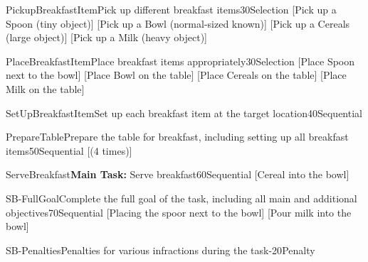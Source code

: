 
\begin{Group}{PickupBreakfastItem}{Pick up different breakfast items}{30}{Selection}
    [Pick up a Spoon (tiny object)]
    [Pick up a Bowl (normal-sized known)]
    [Pick up a Cereals (large object)]
    [Pick up a Milk (heavy object)]
\end{Group}

\begin{Group}{PlaceBreakfastItem}{Place breakfast items appropriately}{30}{Selection}
    [Place Spoon next to the bowl]
    [Place Bowl on the table]
    [Place Cereals on the table]
    [Place Milk on the table]
\end{Group}

\begin{Group}{SetUpBreakfastItem}{Set up each breakfast item at the target location}{40}{Sequential}
\end{Group}

\begin{Group}{PrepareTable}{Prepare the table for breakfast, including setting up all breakfast items}{50}{Sequential}
    [(4 times)]
\end{Group}

\begin{Group}{ServeBreakfast}{\textbf{\textcolor{myturquoise}{Main Task:}} Serve breakfast}{60}{Sequential}
    [Cereal into the bowl]
\end{Group}

\begin{Group}{SB-FullGoal}{Complete the full goal of the task, including all main and additional objectives}{70}{Sequential}
    [Placing the spoor next to the bowl]
    [Pour milk into the bowl]
\end{Group}

\begin{Group}{SB-Penalties}{Penalties for various infractions during the task}{-20}{Penalty}
\end{Group}
